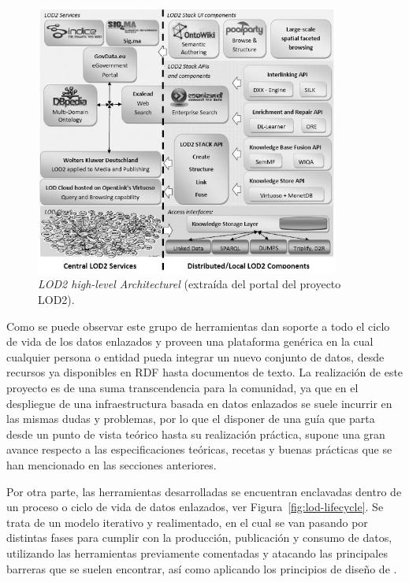 \begin{figure}[!htb]
\centering
	\includegraphics[width=10cm]{images/phd/lod2-high-level-architecture}
\caption{\textit{LOD2 high-level Architecturel} (extraída del portal del proyecto LOD2).}
\label{fig:lod-arch}
\end{figure}


Como se puede observar este grupo de herramientas dan soporte a todo el ciclo de vida de los datos enlazados y proveen
una plataforma genérica en la cual cualquier persona o entidad pueda integrar un nuevo conjunto de datos, desde
recursos ya disponibles en \gls{RDF} hasta documentos de texto. La realización de este proyecto es de una suma transcendencia
para la comunidad, ya que en el despliegue de una infraestructura basada en datos enlazados se suele incurrir en las mismas
dudas y problemas, por lo que el disponer de una guía que parta desde un punto de vista teórico hasta su realización práctica, 
supone una gran avance respecto a las especificaciones teóricas, recetas y buenas prácticas que se han mencionado en las
secciones anteriores. 

Por otra parte, las herramientas desarrolladas se encuentran enclavadas dentro de un proceso o ciclo de vida de datos enlazados,
ver Figura~\ref{fig:lod-lifecycle}. Se trata de un modelo iterativo y realimentado, en el cual se van pasando por distintas fases
para cumplir con la producción, publicación y consumo de datos, utilizando las herramientas previamente comentadas y atacando
las principales barreras que se suelen encontrar, así como aplicando los principios de diseño de \linkeddata.


